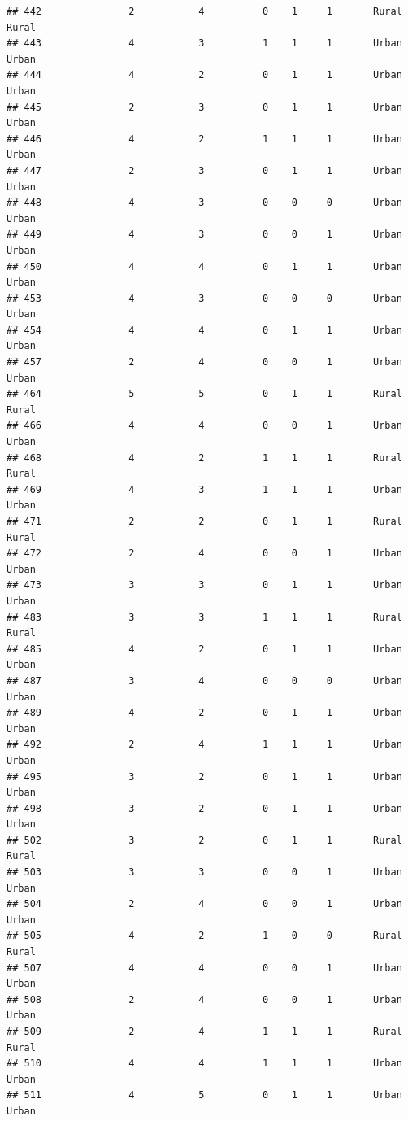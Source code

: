 \documentclass[
]{article}
\begin{document}
\begin{verbatim}
## 442               2           4          0    1     1       Rural Rural
## 443               4           3          1    1     1       Urban Urban
## 444               4           2          0    1     1       Urban Urban
## 445               2           3          0    1     1       Urban Urban
## 446               4           2          1    1     1       Urban Urban
## 447               2           3          0    1     1       Urban Urban
## 448               4           3          0    0     0       Urban Urban
## 449               4           3          0    0     1       Urban Urban
## 450               4           4          0    1     1       Urban Urban
## 453               4           3          0    0     0       Urban Urban
## 454               4           4          0    1     1       Urban Urban
## 457               2           4          0    0     1       Urban Urban
## 464               5           5          0    1     1       Rural Rural
## 466               4           4          0    0     1       Urban Urban
## 468               4           2          1    1     1       Rural Rural
## 469               4           3          1    1     1       Urban Urban
## 471               2           2          0    1     1       Rural Rural
## 472               2           4          0    0     1       Urban Urban
## 473               3           3          0    1     1       Urban Urban
## 483               3           3          1    1     1       Rural Rural
## 485               4           2          0    1     1       Urban Urban
## 487               3           4          0    0     0       Urban Urban
## 489               4           2          0    1     1       Urban Urban
## 492               2           4          1    1     1       Urban Urban
## 495               3           2          0    1     1       Urban Urban
## 498               3           2          0    1     1       Urban Urban
## 502               3           2          0    1     1       Rural Rural
## 503               3           3          0    0     1       Urban Urban
## 504               2           4          0    0     1       Urban Urban
## 505               4           2          1    0     0       Rural Rural
## 507               4           4          0    0     1       Urban Urban
## 508               2           4          0    0     1       Urban Urban
## 509               2           4          1    1     1       Rural Rural
## 510               4           4          1    1     1       Urban Urban
## 511               4           5          0    1     1       Urban Urban

\end{verbatim}
\end{document}
